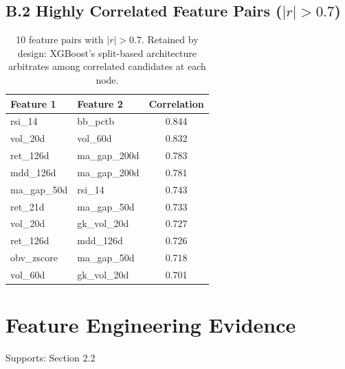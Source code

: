 \documentclass[11pt, a4paper]{article}
\begin{document}
\subsection*{B.2 Highly Correlated Feature Pairs ($|r|>0.7$)}
\begin{table}[h]
\centering
\begin{tabular}{llc}
\toprule
\textbf{Feature 1} & \textbf{Feature 2} & \textbf{Correlation} \\
\midrule
rsi\_14 & bb\_pctb & 0.844 \\
vol\_20d & vol\_60d & 0.832 \\
ret\_126d & ma\_gap\_200d & 0.783 \\
mdd\_126d & ma\_gap\_200d & 0.781 \\
ma\_gap\_50d & rsi\_14 & 0.743 \\
ret\_21d & ma\_gap\_50d & 0.733 \\
vol\_20d & gk\_vol\_20d & 0.727 \\
ret\_126d & mdd\_126d & 0.726 \\
obv\_zscore & ma\_gap\_50d & 0.718 \\
vol\_60d & gk\_vol\_20d & 0.701 \\
\bottomrule
\end{tabular}
\caption{10 feature pairs with $|r|>0.7$. Retained by design: XGBoost's split-based architecture arbitrates among correlated candidates at each node.}
\end{table}

\section{Feature Engineering Evidence}
Supports: Section 2.2
\end{document}
